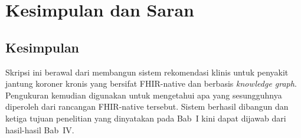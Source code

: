 \chapter{Kesimpulan dan Saran}

\section{Kesimpulan}

Skripsi ini berawal dari membangun sistem rekomendasi klinis untuk penyakit
jantung koroner kronis yang bersifat FHIR-native dan berbasis \emph{knowledge graph}. Pengukuran kemudian digunakan untuk mengetahui apa yang sesungguhnya diperoleh dari rancangan FHIR-native
tersebut. Sistem berhasil dibangun dan ketiga tujuan penelitian yang dinyatakan pada Bab~I kini
dapat dijawab dari hasil-hasil Bab~IV.

